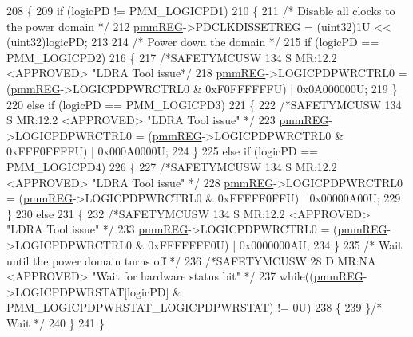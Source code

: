 \begin{DoxyCode}
208 \{
209     \textcolor{keywordflow}{if} (logicPD != PMM\_LOGICPD1)
210     \{
211         \textcolor{comment}{/* Disable all clocks to the power domain */}
212         \mbox{\hyperlink{reg__pmm_8h_a57b193bea1bf1951b97bdfee07f48598}{pmmREG}}->PDCLKDISSETREG = (uint32)1U << (uint32)logicPD;
213         
214         \textcolor{comment}{/* Power down the domain */}
215         \textcolor{keywordflow}{if} (logicPD == PMM\_LOGICPD2)
216         \{
217             \textcolor{comment}{/*SAFETYMCUSW 134 S MR:12.2 <APPROVED> "LDRA Tool issue*/}
218             \mbox{\hyperlink{reg__pmm_8h_a57b193bea1bf1951b97bdfee07f48598}{pmmREG}}->LOGICPDPWRCTRL0 = (\mbox{\hyperlink{reg__pmm_8h_a57b193bea1bf1951b97bdfee07f48598}{pmmREG}}->LOGICPDPWRCTRL0 & 0xF0FFFFFFU) | 0x0A000000U;
219         \}
220         \textcolor{keywordflow}{else} \textcolor{keywordflow}{if} (logicPD == PMM\_LOGICPD3)
221         \{
222             \textcolor{comment}{/*SAFETYMCUSW 134 S MR:12.2 <APPROVED> "LDRA Tool issue" */}
223             \mbox{\hyperlink{reg__pmm_8h_a57b193bea1bf1951b97bdfee07f48598}{pmmREG}}->LOGICPDPWRCTRL0 = (\mbox{\hyperlink{reg__pmm_8h_a57b193bea1bf1951b97bdfee07f48598}{pmmREG}}->LOGICPDPWRCTRL0 & 0xFFF0FFFFU) | 0x000A0000U;
224         \}
225         \textcolor{keywordflow}{else} \textcolor{keywordflow}{if} (logicPD == PMM\_LOGICPD4)
226         \{
227             \textcolor{comment}{/*SAFETYMCUSW 134 S MR:12.2 <APPROVED> "LDRA Tool issue" */}
228             \mbox{\hyperlink{reg__pmm_8h_a57b193bea1bf1951b97bdfee07f48598}{pmmREG}}->LOGICPDPWRCTRL0 = (\mbox{\hyperlink{reg__pmm_8h_a57b193bea1bf1951b97bdfee07f48598}{pmmREG}}->LOGICPDPWRCTRL0 & 0xFFFFF0FFU) | 0x00000A00U;
229         \}
230         \textcolor{keywordflow}{else}
231         \{
232             \textcolor{comment}{/*SAFETYMCUSW 134 S MR:12.2 <APPROVED> "LDRA Tool issue" */}
233             \mbox{\hyperlink{reg__pmm_8h_a57b193bea1bf1951b97bdfee07f48598}{pmmREG}}->LOGICPDPWRCTRL0 = (\mbox{\hyperlink{reg__pmm_8h_a57b193bea1bf1951b97bdfee07f48598}{pmmREG}}->LOGICPDPWRCTRL0 & 0xFFFFFFF0U) | 0x0000000AU;
234         \}
235         \textcolor{comment}{/* Wait until the power domain turns off */}
236         \textcolor{comment}{/*SAFETYMCUSW 28 D MR:NA <APPROVED> "Wait for hardware status bit" */}
237         \textcolor{keywordflow}{while}((\mbox{\hyperlink{reg__pmm_8h_a57b193bea1bf1951b97bdfee07f48598}{pmmREG}}->LOGICPDPWRSTAT[logicPD] & PMM\_LOGICPDPWRSTAT\_LOGICPDPWRSTAT) != 0U)
238         \{ 
239         \}\textcolor{comment}{/* Wait */}  
240     \}
241 \}
\end{DoxyCode}
\mbox{\label{group__PMM_ga962af2aa251e590f1adb4dd29019a508}} 

